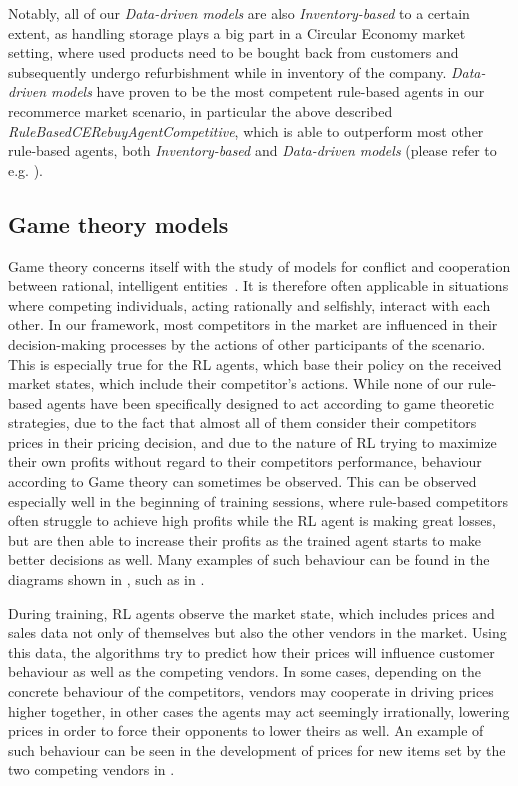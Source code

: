 Notably, all of our \emph{Data-driven models} are also \emph{Inventory-based} to a certain extent, as handling storage plays a big part in a Circular Economy market setting, where used products need to be bought back from customers and subsequently undergo refurbishment while in inventory of the company. \emph{Data-driven models} have proven to be the most competent rule-based agents in our recommerce market scenario, in particular the above described \emph{RuleBasedCERebuyAgentCompetitive}, which is able to outperform most other rule-based agents, both \emph{Inventory-based} and \emph{Data-driven models} (please refer to e.g. ).

\subsection{Game theory models}\label{subsec:GameTheory}

Game theory concerns itself with the study of models for conflict and cooperation between rational, intelligent entities~\cite{GameTheory}. It is therefore often applicable in situations where competing individuals, acting rationally and selfishly, interact with each other. In our framework, most competitors in the market are influenced in their decision-making processes by the actions of other participants of the scenario. This is especially true for the RL agents, which base their policy on the received market states, which include their competitor's actions. While none of our rule-based agents have been specifically designed to act according to game theoretic strategies, due to the fact that almost all of them consider their competitors prices in their pricing decision, and due to the nature of RL trying to maximize their own profits without regard to their competitors performance, behaviour according to Game theory can sometimes be observed. This can be observed especially well in the beginning of training sessions, where rule-based competitors often struggle to achieve high profits while the RL agent is making great losses, but are then able to increase their profits as the trained agent starts to make better decisions as well. Many examples of such behaviour can be found in the diagrams shown in , such as in .

During training, RL agents observe the market state, which includes prices and sales data not only of themselves but also the other vendors in the market. Using this data, the algorithms try to predict how their prices will influence customer behaviour as well as the competing vendors. In some cases, depending on the concrete behaviour of the competitors, vendors may cooperate in driving prices higher together, in other cases the agents may act seemingly irrationally, lowering prices in order to force their opponents to lower theirs as well. An example of such behaviour can be seen in the development of prices for new items set by the two competing vendors in .

